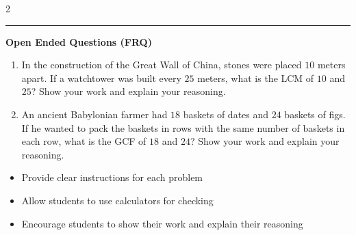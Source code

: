 \documentclass[10pt]{article}
\begin{document}
\begin{multicols}{2}
\begin{enumerate}[label=\textbf{Q\arabic*.}, leftmargin=*, itemsep=6pt, parsep=0pt]
\end{enumerate}
\end{multicols}

\vspace{-0.2cm}
\hrule
\vspace{0.2cm}
\textbf{\small Open Ended Questions (FRQ)}
\begin{enumerate}[label=\textbf{Q\arabic*.}, start=9, itemsep=5pt, topsep=0pt]

  \item \small In the construction of the Great Wall of China, stones were placed $10$ meters apart. If a watchtower was built every $25$ meters, what is the LCM of $10$ and $25$? Show your work and explain your reasoning. \vspace{2cm}

  \item \small An ancient Babylonian farmer had $18$ baskets of dates and $24$ baskets of figs. If he wanted to pack the baskets in rows with the same number of baskets in each row, what is the GCF of $18$ and $24$? Show your work and explain your reasoning. \vspace{2cm}

\end{enumerate}

\vfill

\begin{tcolorbox}[colback=blue!5, colframe=mainblue!50, title=\small \textbf{Chef's Tips}, fonttitle=\bfseries, bottom=1mm]
\begin{itemize}[noitemsep, topsep=2pt, leftmargin=0.5cm]
  \item \scriptsize Provide clear instructions for each problem\item \scriptsize Allow students to use calculators for checking\item \scriptsize Encourage students to show their work and explain their reasoning
\end{itemize}
\end{tcolorbox}
\end{document}
